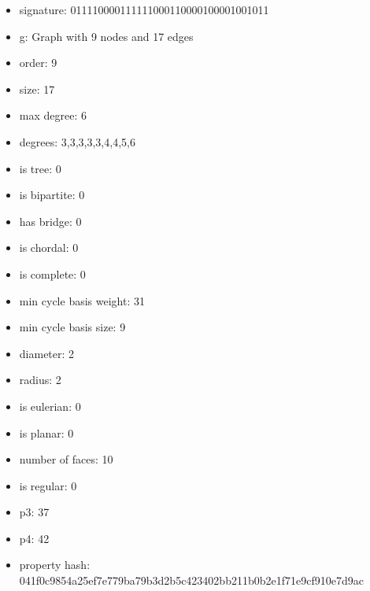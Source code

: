 \newpage
\begin{figure}
\end{figure}
\begin{itemize}
\item signature: 011110000111111000110000100001001011
\item g: Graph with 9 nodes and 17 edges
\item order: 9
\item size: 17
\item max degree: 6
\item degrees: 3,3,3,3,3,4,4,5,6
\item is tree: 0
\item is bipartite: 0
\item has bridge: 0
\item is chordal: 0
\item is complete: 0
\item min cycle basis weight: 31
\item min cycle basis size: 9
\item diameter: 2
\item radius: 2
\item is eulerian: 0
\item is planar: 0
\item number of faces: 10
\item is regular: 0
\item p3: 37
\item p4: 42
\item property hash: 041f0c9854a25ef7e779ba79b3d2b5c423402bb211b0b2e1f71e9cf910e7d9ac
\end{itemize}
